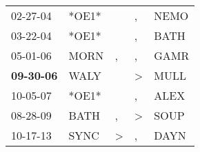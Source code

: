 \begin{supertabular}{p{0.07\textwidth}p{0.06\textwidth}p{0.02\textwidth}p{0.02\textwidth}p{0.06\textwidth}}
          02-27-04\textsuperscript{} &                   *OE1* &               &             , &  NEMO\textsuperscript{} \\
          03-22-04\textsuperscript{} &                   *OE1* &               &             , &  BATH\textsuperscript{} \\
          05-01-06\textsuperscript{} &  MORN\textsuperscript{} &             , &             , &  GAMR\textsuperscript{} \\
 \textbf{09-30-06\textsuperscript{}} &  WALY\textsuperscript{} &               &  \textgreater &  MULL\textsuperscript{} \\
          10-05-07\textsuperscript{} &                   *OE1* &               &             , &  ALEX\textsuperscript{} \\
          08-28-09\textsuperscript{} &  BATH\textsuperscript{} &             , &  \textgreater &  SOUP\textsuperscript{} \\
          10-17-13\textsuperscript{} &  SYNC\textsuperscript{} &  \textgreater &             , &  DAYN\textsuperscript{} \\
\end{supertabular}
